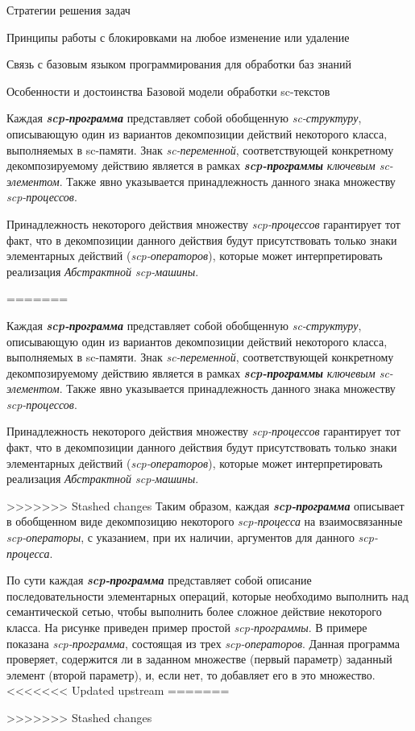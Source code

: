 \begin{frame}{Стратегии решения задач}
\begin{frame}{\large Принципы работы с блокировками на любое изменение или удаление}
\begin{frame}{Связь с базовым языком программирования для обработки баз
знаний}
\begin{frame}{Особенности и достоинства Базовой модели обработки sc-текстов}
\begin{frame}{}
\newpage
Каждая \textbf{\textit{scp-программа}} представляет собой обобщенную \textit{sc-структуру}, описывающую один из вариантов декомпозиции действий некоторого класса, выполняемых в sc-памяти. Знак \textit{sc-переменной}, соответствующей конкретному декомпозируемому действию является в рамках \textbf{\textit{scp-программы}} \textit{ключевым sc-элементом\scnrolesign}. Также явно указывается принадлежность данного знака множеству \textit{scp-процессов}.
	
Принадлежность некоторого действия множеству \textit{scp-процессов} гарантирует тот факт, что в декомпозиции данного действия будут присутствовать только знаки элементарных действий (\textit{scp-операторов}), которые может интерпретировать реализация \textit{Абстрактной scp-машины}.

=======
\end{frame}

\begin{frame}{}
Каждая \textbf{\textit{scp-программа}} представляет собой обобщенную \textit{sc-структуру}, описывающую один из вариантов декомпозиции действий некоторого класса, выполняемых в sc-памяти. Знак \textit{sc-переменной}, соответствующей конкретному декомпозируемому действию является в рамках \textbf{\textit{scp-программы}} \textit{ключевым sc-элементом\scnrolesign}. Также явно указывается принадлежность данного знака множеству \textit{scp-процессов}.
	
Принадлежность некоторого действия множеству \textit{scp-процессов} гарантирует тот факт, что в декомпозиции данного действия будут присутствовать только знаки элементарных действий (\textit{scp-операторов}), которые может интерпретировать реализация \textit{Абстрактной scp-машины}.
\end{frame}

\begin{frame}{}
>>>>>>> Stashed changes
Таким образом, каждая \textbf{\textit{scp-программа}} описывает в обобщенном виде декомпозицию некоторого \textit{\mbox{scp-процесса}} на взаимосвязанные \textit{scp-операторы}, с указанием, при их наличии, аргументов для данного \textit{scp-процесса}.

По сути каждая \textbf{\textit{scp-программа}} представляет собой описание последовательности элементарных операций, которые необходимо выполнить над семантической сетью, чтобы выполнить более сложное действие некоторого класса.
На рисунке приведен пример простой \textit{scp-программы}. В примере показана \textit{scp-программа}, состоящая из трех \textit{scp-операторов}. Данная программа проверяет, содержится ли в заданном множестве (первый параметр) заданный элемент (второй параметр), и, если нет, то добавляет его в это множество.
<<<<<<< Updated upstream
=======
\end{frame}
>>>>>>> Stashed changes


\end{frame}
\end{frame}
\end{frame}
\end{frame}
